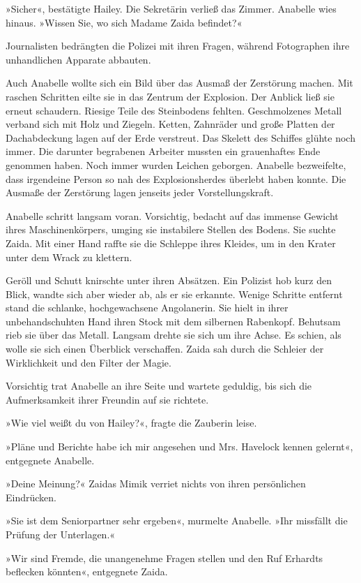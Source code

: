 »Sicher«, bestätigte Hailey. Die Sekretärin verließ das Zimmer.
Anabelle wies hinaus. »Wissen Sie, wo sich Madame Zaida befindet?«

\tb

Journalisten bedrängten die Polizei mit ihren Fragen, während
Fotographen ihre unhandlichen Apparate abbauten.

Auch Anabelle wollte sich ein Bild über das Ausmaß der Zerstörung
machen. Mit raschen Schritten eilte sie in das Zentrum der
Explosion. Der Anblick ließ sie erneut schaudern. Riesige Teile des
Steinbodens fehlten. Geschmolzenes Metall verband sich mit Holz und
Ziegeln. Ketten, Zahnräder und große Platten der Dachabdeckung
lagen auf der Erde verstreut. Das Skelett des Schiffes glühte noch
immer. Die darunter begrabenen Arbeiter mussten ein grauenhaftes
Ende genommen haben. Noch immer wurden Leichen geborgen. Anabelle
bezweifelte, dass irgendeine Person so nah des Explosionsherdes
überlebt haben konnte. Die Ausmaße der Zerstörung lagen jenseits
jeder Vorstellungskraft.

Anabelle schritt langsam voran. Vorsichtig, bedacht auf das immense
Gewicht ihres Maschinenkörpers, umging sie instabilere Stellen des
Bodens. Sie suchte Zaida. Mit einer Hand raffte sie die Schleppe
ihres Kleides, um in den Krater unter dem Wrack zu klettern.

Geröll und Schutt knirschte unter ihren Absätzen. Ein Polizist hob
kurz den Blick, wandte sich aber wieder ab, als er sie erkannte.
Wenige Schritte entfernt stand die schlanke, hochgewachsene
Angolanerin. Sie hielt in ihrer unbehandschuhten Hand ihren Stock
mit dem silbernen Rabenkopf. Behutsam rieb sie über das Metall.
Langsam drehte sie sich um ihre Achse. Es schien, als wolle sie
sich einen Überblick verschaffen. Zaida sah durch die Schleier der
Wirklichkeit und den Filter der Magie.

Vorsichtig trat Anabelle an ihre Seite und wartete geduldig, bis
sich die Aufmerksamkeit ihrer Freundin auf sie richtete.

»Wie viel weißt du von Hailey?«, fragte die Zauberin leise.

»Pläne und Berichte habe ich mir angesehen und Mrs. Havelock kennen
gelernt«, entgegnete Anabelle.

»Deine Meinung?« Zaidas Mimik verriet nichts von ihren persönlichen
Eindrücken.

»Sie ist dem Seniorpartner sehr ergeben«, murmelte Anabelle. »Ihr
missfällt die Prüfung der Unterlagen.«

»Wir sind Fremde, die unangenehme Fragen stellen und den Ruf
Erhardts beflecken könnten«, entgegnete Zaida.

